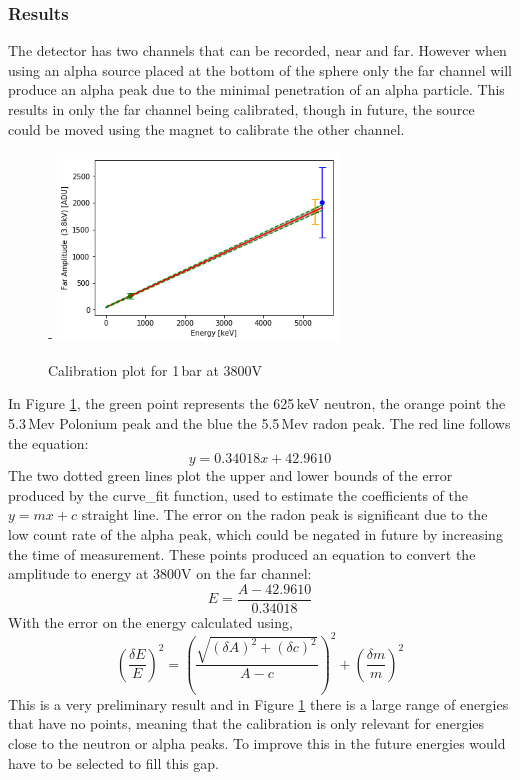 \documentclass[a4paper]{article}
\begin{document}
\subsubsection{Results}
The detector has two channels that can be recorded, near and far. However when using an alpha source placed at the bottom of the sphere only the far channel will produce an alpha peak due to the minimal penetration of an alpha particle. This results in only the far channel being calibrated, though in future, the source could be moved using the magnet to calibrate the other channel. 
\begin{figure}[H]-
    \centering
    \includegraphics[height=5cm]{plots/3800_2N.png}
    \caption{Calibration plot for 1\,bar at 3800V}
    \label{fig:cali}
\end{figure}
\noindent In Figure \ref{fig:cali}, the green point represents the 625\,keV neutron, the orange point the 5.3\,Mev Polonium peak and the blue the 5.5\,Mev radon peak. The red line follows the equation:
\begin{equation}
    y = 0.34018x + 42.9610
\end{equation}
The two dotted green lines plot the upper and lower bounds of the error produced by the curve\_fit function, used to estimate the coefficients of the $y=mx+c$ straight line. The error on the radon peak is significant due to the low count rate of the alpha peak, which could be negated in future by increasing the time of measurement. These points produced an equation to convert the amplitude to energy at 3800V on the far channel:
\begin{equation}
    E = \frac{A-42.9610}{0.34018}
\end{equation}
With the error on the energy calculated using,
\begin{equation} \label{eq:error}
    \left(\frac{\delta E}{E}\right)^2 = \left(\frac{\sqrt{(\delta A)^2 + (\delta c)^2}}{A-c}\right)^2+\left(\frac{\delta m}{m}\right)^2
\end{equation}
This is a very preliminary result and in Figure \ref{fig:cali} there is a large range of energies that have no points, meaning that the calibration is only relevant for energies close to the neutron or alpha peaks. To improve this in the future energies would have to be selected to fill this gap.
\end{document}
